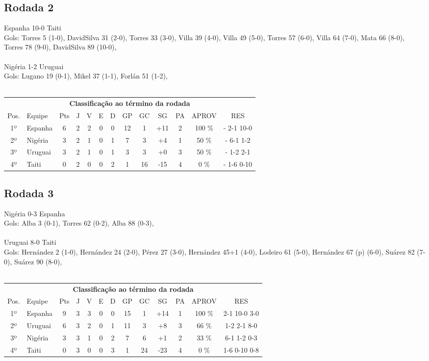 \documentclass{article}
\begin{document}
\subsection*{Rodada 2}
Espanha 10-0 Taiti\\
Gols: Torres 5 (1-0), DavidSilva 31 (2-0), Torres 33 (3-0), Villa 39 (4-0), Villa 49 (5-0), Torres 57 (6-0), Villa 64 (7-0), Mata 66 (8-0), Torres 78 (9-0), DavidSilva 89 (10-0), \\
\\
Nigéria 1-2 Uruguai\\
Gols: Lugano 19 (0-1), Mikel 37 (1-1), Forlán 51 (1-2), \\
\\
\begin{center}
\begin{tabular}{| c | l | c | c | c | c | c | c | c | c | c | c | c |}
\multicolumn{13}{c}{\textbf{Classificação ao término da rodada}}\\
Pos.&Equipe&Pts&J&V&E&D&GP&GC&SG&PA&APROV&RES\\
1º&Espanha             &6&2	&2&0&0	&12&1&+11	&2&100 \%	& - 2-1 10-0 \\
2º&Nigéria             &3&2	&1&0&1	&7&3&+4	&1& 50 \%	& - 6-1 1-2 \\
3º&Uruguai             &3&2	&1&0&1	&3&3&+0	&3& 50 \%	& - 1-2 2-1 \\
4º&Taiti               &0&2	&0&0&2	&1&16&-15	&4&  0 \%	& - 1-6 0-10 \\
\end{tabular}
\end{center}


\subsection*{Rodada 3}
Nigéria 0-3 Espanha\\
Gols: Alba 3 (0-1), Torres 62 (0-2), Alba 88 (0-3), \\
\\
Uruguai 8-0 Taiti\\
Gols: Hernández 2 (1-0), Hernández 24 (2-0), Pérez 27 (3-0), Hernández 45+1 (4-0), Lodeiro 61 (5-0), Hernández 67 (p) (6-0), Suárez 82 (7-0), Suárez 90 (8-0), \\
\\
\begin{center}
\begin{tabular}{| c | l | c | c | c | c | c | c | c | c | c | c | c |}
\multicolumn{13}{c}{\textbf{Classificação ao término da rodada}}\\
Pos.&Equipe&Pts&J&V&E&D&GP&GC&SG&PA&APROV&RES\\
1º&Espanha             &9&3	&3&0&0	&15&1&+14	&1&100 \%	&2-1 10-0 3-0 \\
2º&Uruguai             &6&3	&2&0&1	&11&3&+8	&3& 66 \%	&1-2 2-1 8-0 \\
3º&Nigéria             &3&3	&1&0&2	&7&6&+1	&2& 33 \%	&6-1 1-2 0-3 \\
4º&Taiti               &0&3	&0&0&3	&1&24&-23	&4&  0 \%	&1-6 0-10 0-8 \\
\end{tabular}
\end{center}
\end{document}
